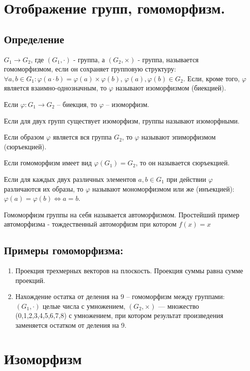\documentclass[12pt]{article}
\begin{document}
\section{Отображение групп, гомоморфизм.}
\subsection{Определение}
$G_1 \rightarrow G_2$, где $(G_1,\cdot)$ - группа, а $(G_2,\times)$ - группа, называется гомоморфизмом, если он сохраняет групповую структуру: $\forall a,b\in G_1: \varphi(a\cdot b)=\varphi(a)\times\varphi(b)$, $\varphi(a),\varphi(b)\in G_2$. Если, кроме того, $\varphi$ является взаимно-однозначным, то $\varphi$ называют изоморфизмом (биекцией).

Если $\varphi:G_1\rightarrow G_2$ -- биекция, то $\varphi$ -- изоморфизм.

Если для двух групп существует изоморфизм, группы называют изоморфными.

Если образом $\varphi$ является вся группа $G_2$, то $\varphi$ называют эпиморфизмом (сюръекцией).

Если гомоморфизм имеет вид $\varphi(G_1)=G_2$, то он называется сюръекцией.

Если для каждых двух различных элементов $a,b\in G_1$ при действии $\varphi$ различаются их образы, то $\varphi$ называют мономорфизмом или же (инъекцией): $\varphi(a)=\varphi(b) \Leftrightarrow a = b$.

Гомоморфизм группы на себя называется автоморфизмом. Простейший пример автоморфизма - тождественный автоморфизм при котором $f(x) = x$

\subsection{Примеры гомоморфизма:}
\begin{enumerate}
    \item Проекция трехмерных векторов на плоскость. Проекция суммы равна сумме проекций.

    \item Нахождение остатка от деления на 9 – гомоморфизм между группами: $(G_1,\cdot)$ целые числа с умножением, $(G_2,\times)$ --- множество (0,1,2,3,4,5,6,7,8) с умножением, при котором результат произведения заменяется остатком от деления на 9.
\end{enumerate}

\section{Изоморфизм}
\end{document}
